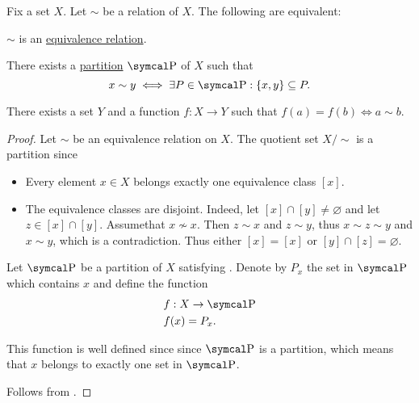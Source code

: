 \begin{proposition}\label{thm:equivalence_partition}
  Fix a set \( X \). Let \( \sim \) be a relation of \( X \). The following are equivalent:
  \begin{DefEnum}
     \( \sim \) is an \hyperref[def:equivalence_relation]{equivalence relation}.

     There exists a \hyperref[def:set_partition]{partition} \( \CP \) of \( X \) such that
    \begin{equation}\label{thm:equivalence_partition/partition/property}
      x \sim y \iff \exists P \in \CP: \{ x, y \} \subseteq P.
    \end{equation}

     There exists a set \( Y \) and a function \( f: X \to Y \) such that \( f(a) = f(b) \iff a \sim b \).
  \end{DefEnum}
\end{proposition}
\begin{proof}
   Let \( \sim \) be an equivalence relation on \( X \). The quotient set \( X / \sim \) is a partition since
  \begin{itemize}
    \item Every element \( x \in X \) belongs exactly one equivalence class \( [x] \).
    \item The equivalence classes are disjoint. Indeed, let \( [x] \cap [y] \neq \varnothing \) and let \( z \in [x] \cap [y] \). Assume\LEM that \( x \not\sim x \). Then \( z \sim x \) and \( z \sim y \), thus \( x \sim z \sim y \) and \( x \sim y \), which is a contradiction. Thus either \( [x] = [x] \) or \( [y] \cap [z] = \varnothing \).
  \end{itemize}

   Let \( \CP \) be a partition of \( X \) satisfying . Denote by \( P_x \) the set in \( \CP \) which contains \( x \) and define the function
  \begin{align*}
     & f: X \to \CP \\
     & f(x) = P_x.
  \end{align*}

  This function is well defined since since \( \CP \) is a partition, which means that \( x \) belongs to exactly one set in \( \CP \).

   Follows from .
\end{proof}
